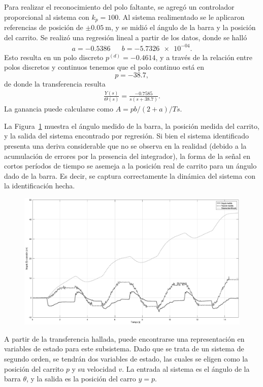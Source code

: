 Para realizar el reconocimiento del polo faltante, se agregó un controlador proporcional al sistema con $k_p = 100$. Al sistema realimentado se le aplicaron referencias de posición de $\pm \qty{0.05}{\m}$, y se midió el ángulo de la barra y la posición del carrito. Se realizó una regresión lineal a partir de los datos, donde se halló
\begin{align*}
    a = -0.5386 && b = \num{-5.7326e-04}.
\end{align*}
Esto resulta en un polo discreto $p^{(d)} = -0.4614$, y a través de la relación entre polos discretos y continuos tenemos que el polo continuo está en
\[
    p = -38.7,
\]
de donde la transferencia resulta
\begin{align*}
    \frac{Y(s)}{\Theta(s)} = \frac{-0.7585}{s(s+38.7)}.
\end{align*}
La ganancia puede calcularse como $A = p b/(2+a)/Ts$.

La Figura~\ref{fig:ident-carro} muestra el ángulo medido de la barra, la posición medida del carrito, y la salida del sistema encontrado por regresión. Si bien el sistema identificado presenta una deriva considerable que no se observa en la realidad (debido a la acumulación de errores por la presencia del integrador), la forma de la señal en cortos períodos de tiempo se asemeja a la posición real de carrito para un ángulo dado de la barra. Es decir, se captura correctamente la dinámica del sistema con la identificación hecha.

\begin{figure}[!htbp]
    \centering
    \includegraphics[width=\linewidth]{img/ident-carrito.eps}
    \caption{}
    \label{fig:ident-carro}
\end{figure}

A partir de la transferencia hallada, puede encontrarse una representación en variables de estado para este subsistema. Dado que se trata de un sistema de segundo orden, se tendrán dos variables de estado, las cuales se eligen como la posición del carrito $p$ y su velocidad $v$. La entrada al sistema es el ángulo de la barra $\theta$, y la salida es la posición del carro $y = p$.

